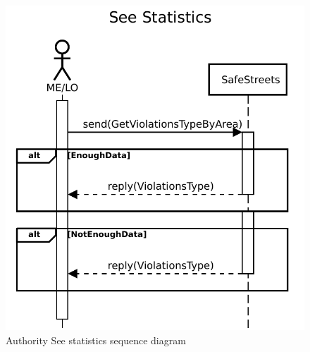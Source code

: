 						\begin{figure}[!h]
								\centering
							\includegraphics[height=0.4\textheight] {images/SequenceDiagram/Authority/SeeStatistics.pdf}
								\caption{Authority See statistics sequence diagram}
						\end{figure}
					\clearpage
